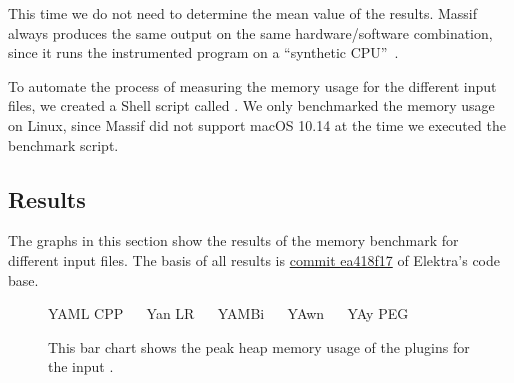 This time we do not need to determine the mean value of the results. Massif always produces the same output on the same hardware/software combination, since it runs the instrumented program \FilePluginGetSet{} on a “synthetic CPU”~\cite{valgrind2019core}.

To automate the process of measuring the memory usage for the different input files, we created a Shell script called \FileBenchmarkMemory{}. We only benchmarked the memory usage on Linux, since Massif did not support macOS 10.14 at the time we executed the benchmark script.

\subsection{Results}

The graphs in this section show the results of the memory benchmark for different input files. The basis of all results is \href{https://github.com/ElektraInitiative/libelektra/commit/ea418f177a5e2707f59f61b5e130a596abdd1c56}{commit ea418f17} of Elektra’s code base.

\begin{figure}[H]
  \begin{bchart}[max=25, width=0.8\textwidth, unit=MB]




  \end{bchart}
  \begin{center}
  \vspace{-0.5cm}
     YAML CPP ~~
     Yan LR ~~
     YAMBi ~~
     YAwn ~~
     YAy PEG
  \vspace{-0.5cm}
  \end{center}
  \caption{This bar chart shows the peak heap memory usage of the plugins for the input \FileKeyFrames{}.}
  \label{fig:benchmark_memory_keyframes}
\end{figure}

